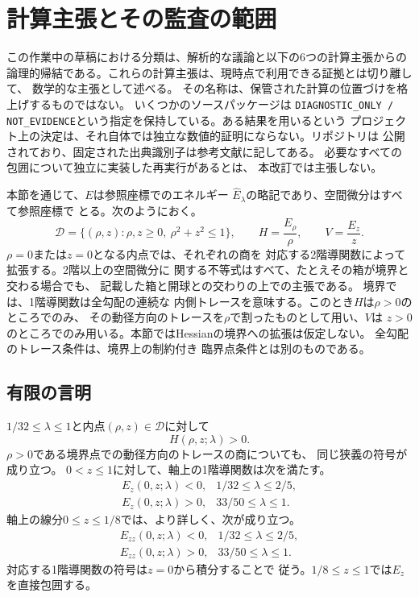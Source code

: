 \section{計算主張とその監査の範囲}
\label{sec:computational}

この作業中の草稿における分類は、解析的な議論と以下の6つの計算主張からの
論理的帰結である。これらの計算主張は、現時点で利用できる証拠とは切り離して、
数学的な主張として述べる。
その名称は、保管された計算の位置づけを格上げするものではない。
いくつかのソースパッケージは
\texttt{DIAGNOSTIC\_ONLY / NOT\_EVIDENCE}という指定を保持している。ある結果を用いるという
プロジェクト上の決定は、それ自体では独立な数値的証明にならない。リポジトリは
公開されており、固定された出典識別子は参考文献に記してある。
必要なすべての包囲について独立に実装した再実行があるとは、
本改訂では主張しない。

本節を通じて、$E$は参照座標でのエネルギー
$\widehat E_\lambda$の略記であり、空間微分はすべて参照座標で
とる。次のようにおく。
\[
 \mathcal D=\{(\rho,z):\rho,z\geq0,\ \rho^2+z^2\leq1\},\qquad
 H=\frac{E_\rho}{\rho},\qquad V=\frac{E_z}{z}.
\]
$\rho=0$または$z=0$となる内点では、それぞれの商を
対応する2階導関数によって拡張する。2階以上の空間微分に
関する不等式はすべて、たとえその箱が境界と交わる場合でも、
記載した箱と開球との交わりの上での主張である。
境界では、1階導関数は全勾配の連続な
内側トレースを意味する。このとき$H$は$\rho>0$のところでのみ、
その動径方向のトレースを$\rho$で割ったものとして用い、$V$は
$z>0$のところでのみ用いる。本節ではHessianの境界への拡張は仮定しない。
全勾配のトレース条件は、境界上の制約付き
臨界点条件とは別のものである。

\subsection{有限の言明}

\begin{computationalassertion}[有限扁平域における横断方向と軸上の符号]
\label{comp:c1}
$1/32\leq\lambda\leq1$と内点$(\rho,z)\in\mathcal D$に対して
\[
 H(\rho,z;\lambda)>0.
\]
$\rho>0$である境界点での動径方向のトレースの商についても、
同じ狭義の符号が成り立つ。
$0<z\leq1$に対して、軸上の1階導関数は次を満たす。
\[
 \begin{array}{ll}
 E_z(0,z;\lambda)<0,&1/32\leq\lambda\leq2/5,\\
 E_z(0,z;\lambda)>0,&33/50\leq\lambda\leq1.
 \end{array}
\]
軸上の線分$0\leq z\leq1/8$では、より詳しく、次が成り立つ。
\[
 \begin{array}{ll}
 E_{zz}(0,z;\lambda)<0,&1/32\leq\lambda\leq2/5,\\
 E_{zz}(0,z;\lambda)>0,&33/50\leq\lambda\leq1.
 \end{array}
\]
対応する1階導関数の符号は$z=0$から積分することで
従う。$1/8\leq z\leq1$では$E_z$を直接包囲する。
\end{computationalassertion}

